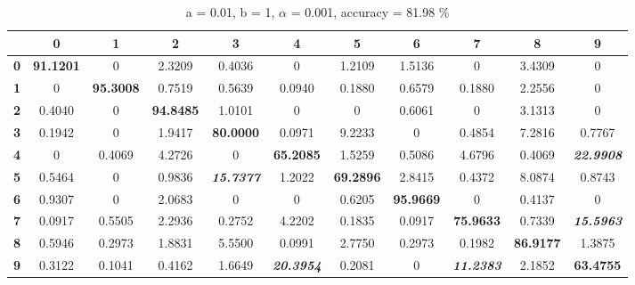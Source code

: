 \documentclass[twoside]{article}
\begin{document}
\begin{table}[h]
	\begin{center}
	\begin{tabular}{|c|c|c|c|c|c|c|c|c|c|c|}
		\hline
		& \textbf{0} & \textbf{1} & \textbf{2} & \textbf{3} & \textbf{4} & \textbf{5} & \textbf{6} & \textbf{7} & \textbf{8} & \textbf{9} \\ \hline
		\textbf{0} & \textbf{91.1201} & 0 & 2.3209 & 0.4036 & 0 & 1.2109 & 1.5136 & 0 & 3.4309 & 0 \\ \hline
		\textbf{1} & 0 & \textbf{95.3008} & 0.7519 & 0.5639 & 0.0940 & 0.1880 & 0.6579 & 0.1880 & 2.2556 & 0 \\ \hline
		\textbf{2} & 0.4040 & 0 & \textbf{94.8485} & 1.0101 & 0 & 0 & 0.6061 & 0 & 3.1313 & 0 \\ \hline
		\textbf{3} & 0.1942 & 0 & 1.9417 & \textbf{80.0000} & 0.0971 & 9.2233 & 0 & 0.4854 & 7.2816 & 0.7767 \\ \hline
		\textbf{4} & 0 & 0.4069 & 4.2726 & 0 & \textbf{65.2085} & 1.5259 & 0.5086 & 4.6796 & 0.4069 & \textit{\textbf{22.9908}} \\ \hline
		\textbf{5} & 0.5464 & 0 & 0.9836 & \textit{\textbf{15.7377}} & 1.2022 & \textbf{69.2896} & 2.8415 & 0.4372 & 8.0874 & 0.8743 \\ \hline
		\textbf{6} & 0.9307 & 0 & 2.0683 & 0 & 0 & 0.6205 & \textbf{95.9669} & 0 & 0.4137 & 0 \\ \hline
		\textbf{7} & 0.0917 & 0.5505 & 2.2936 & 0.2752 & 4.2202 & 0.1835 & 0.0917 & \textbf{75.9633} & 0.7339 & \textit{\textbf{15.5963}} \\ \hline
		\textbf{8} & 0.5946 & 0.2973 & 1.8831 & 5.5500 & 0.0991 & 2.7750 & 0.2973 & 0.1982 & \textbf{86.9177} & 1.3875 \\ \hline
		\textbf{9} & 0.3122 & 0.1041 & 0.4162 & 1.6649 & \textit{\textbf{20.3954}} & 0.2081 & 0 & \textit{\textbf{11.2383}} & 2.1852 & \textbf{63.4755} \\ \hline
	\end{tabular}
	\label{table:2}
	\caption{a = 0.01, b = 1, $\alpha$ = 0.001, accuracy = 81.98 \%}
	\end{center}	
\end{table}
\end{document}
